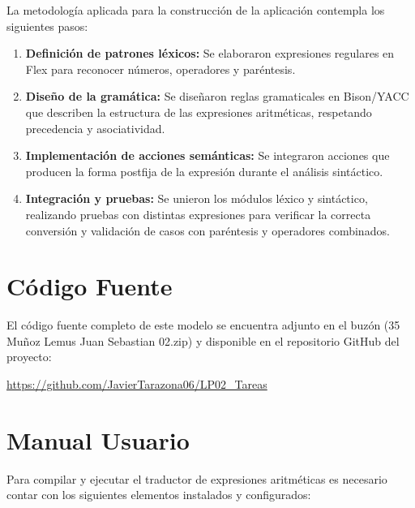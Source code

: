 \documentclass{article}
\begin{document}
La metodología aplicada para la construcción de la aplicación contempla los siguientes pasos:  
\begin{enumerate}
    \item \textbf{Definición de patrones léxicos:} Se elaboraron expresiones regulares en Flex para reconocer números, operadores y paréntesis.
    \item \textbf{Diseño de la gramática:} Se diseñaron reglas gramaticales en Bison/YACC que describen la estructura de las expresiones aritméticas, respetando precedencia y asociatividad.
    \item \textbf{Implementación de acciones semánticas:} Se integraron acciones que producen la forma postfija de la expresión durante el análisis sintáctico.
    \item \textbf{Integración y pruebas:} Se unieron los módulos léxico y sintáctico, realizando pruebas con distintas expresiones para verificar la correcta conversión y validación de casos con paréntesis y operadores combinados.
\end{enumerate}


\section{Código Fuente}\label{sec:cod}

El código fuente completo de este modelo se encuentra adjunto en el buzón 
(35 Muñoz Lemus Juan Sebastian 02.zip)
y disponible en el repositorio GitHub del proyecto:

\begin{center}
\url{https://github.com/JavierTarazona06/LP02_Tareas}
\end{center}



\section{Manual Usuario}\label{sec:man_u}

Para compilar y ejecutar el traductor de expresiones aritméticas es necesario contar con los siguientes elementos instalados y configurados:
\end{document}

